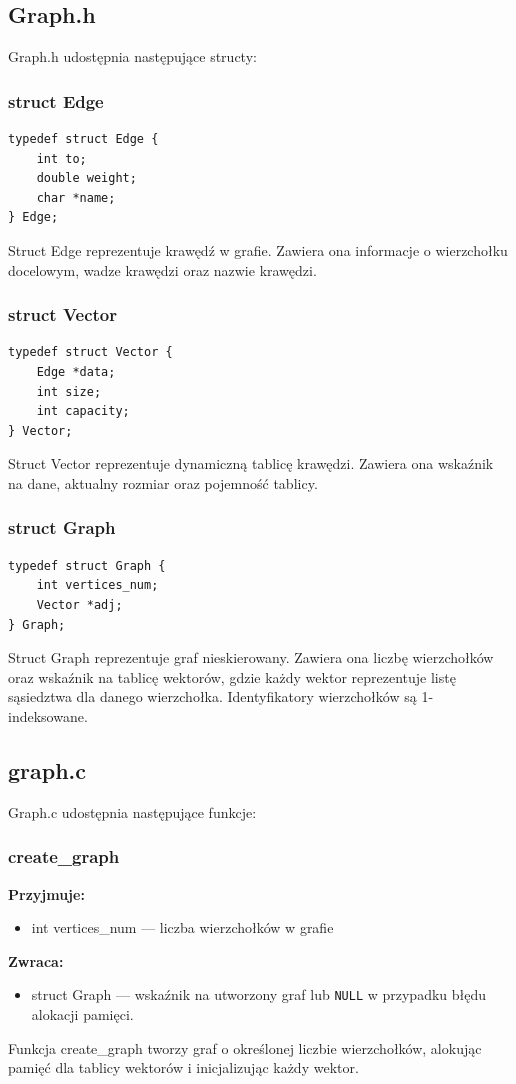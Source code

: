 \documentclass[12pt]{article}
\begin{document}
\subsection{Graph.h}
Graph.h udostępnia następujące structy:
\subsubsection{struct Edge}
\begin{lstlisting}
typedef struct Edge {
    int to;
    double weight;
    char *name;
} Edge;
\end{lstlisting}
Struct Edge reprezentuje krawędź w grafie. Zawiera ona informacje o wierzchołku
docelowym, wadze krawędzi oraz nazwie krawędzi.
\subsubsection{struct Vector}
\begin{lstlisting}
typedef struct Vector {
    Edge *data;
    int size;
    int capacity;
} Vector;
\end{lstlisting}
Struct Vector reprezentuje dynamiczną tablicę krawędzi. Zawiera ona wskaźnik na
dane, aktualny rozmiar oraz pojemność tablicy.
\subsubsection{struct Graph}
\begin{lstlisting}
typedef struct Graph {
    int vertices_num;
    Vector *adj;
} Graph;
\end{lstlisting}
Struct Graph reprezentuje graf nieskierowany. Zawiera ona liczbę wierzchołków
oraz wskaźnik na tablicę wektorów, gdzie każdy wektor reprezentuje listę
sąsiedztwa dla danego wierzchołka. Identyfikatory wierzchołków są 1-indeksowane.
\subsection{graph.c}
Graph.c udostępnia następujące funkcje:
\subsubsection{create\_graph}
\textbf{Przyjmuje:}
\begin{itemize}
	\item int vertices\_num --- liczba wierzchołków w grafie
\end{itemize}
\textbf{Zwraca:}
\begin{itemize}
	\item struct Graph --- wskaźnik na utworzony graf lub \texttt{NULL} w przypadku błędu alokacji pamięci.
\end{itemize}
Funkcja create\_graph tworzy graf o określonej liczbie wierzchołków, alokując
pamięć dla tablicy wektorów i inicjalizując każdy wektor.
\end{document}
